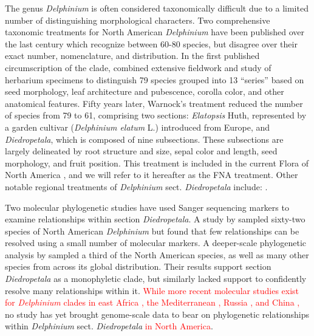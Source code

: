 \documentclass[11pt]{article}
\begin{document}
The genus \emph{Delphinium} is often considered taxonomically difficult due to a 
limited number of 
distinguishing
morphological characters. Two comprehensive 
taxonomic treatments for North American \emph{Delphinium} have been published over 
the last century which recognize between 60-80 species, but disagree over their
exact number, nomenclature, and distribution. 
% 
In the first published circumscription of the clade, \cite{ewan_synopsis_1945}
combined extensive 
fieldwork and study of herbarium specimens to distinguish 79 species grouped 
into 13 “series” based on seed morphology, leaf architecture and pubescence, 
corolla color, and other anatomical features. 
% 
Fifty years later, Warnock’s treatment \citep{warnock_taxonomic_1995}
reduced the number of species 
from 79 to 61, comprising two sections: \emph{Elatopsis} Huth, represented by a garden 
cultivar (\emph{Delphinium elatum} L.) introduced from Europe, and 
\emph{Diedropetala}, which is composed of nine subsections.
%
These subsections are largely delineated by root structure and size, 
sepal color and length, seed morphology, and fruit position.
% 
This treatment is included in the current Flora of North America
\citep[FNA;][]{Warnock_1997_FNA_Delphinium}, and we will refer to it hereafter as 
the FNA treatment.
Other notable regional treatments of \emph{Delphinium} sect. \emph{Diedropetala} include:
\cite{rydberg_delphinium_1899, ewan_genus_1942, wilde1931studies, cronquist_intermountain_1984, ackerfield_flora_2022, chambers_comments_2018, lewis_taxonomic_1954,koontz_delphinium_2012,WeberWittmann2012,holmgren2012intermountain}.

Two molecular phylogenetic studies have used
Sanger sequencing markers to examine relationships within 
section \emph{Diedropetala}.
A study by \citet{koontz_using_2004} sampled sixty-two species of 
North American \emph{Delphinium} but found that few relationships can
be resolved using a small number of molecular markers. 
% 
A deeper-scale phylogenetic analysis by \cite{jabbour_phylogeny_2012} 
sampled a third of the North American species, as well as many other
species from across its global distribution.
Their results support section \emph{Diedropetala} as a monophyletic 
clade, but similarly lacked support to confidently 
resolve many relationships within it. \textcolor{red}{While more recent molecular studies exist for \textit{Delphinium} clades in east Africa \citep{Chartier2016}, the Mediterranean \citep{xiang_recircumscription_2017}, Russia \citep{Kashinetal2021}, and China \citep{Song2024},} no study has yet brought genome-scale data to bear on phylogenetic 
relationships within \emph{Delphinium} sect. \textit{Diedropetala} \textcolor{red}{in North America}.
\end{document}
